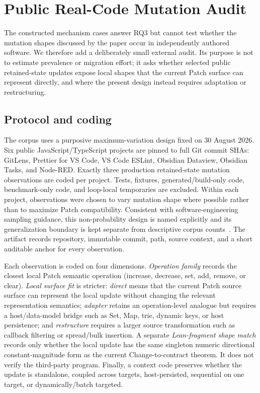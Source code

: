 \section{Public Real-Code Mutation Audit}
\label{sec:real-code-audit}

The constructed mechanism cases answer RQ3 but cannot test whether the mutation shapes discussed by the paper occur in independently authored software. We therefore add a deliberately small external audit. Its purpose is not to estimate prevalence or migration effort; it asks whether selected public retained-state updates expose local shapes that the current Patch surface can represent directly, and where the present design instead requires adaptation or restructuring.

\subsection{Protocol and coding}
The corpus uses a purposive maximum-variation design fixed on 30 August 2026. Six public JavaScript/TypeScript projects are pinned to full Git commit SHAs: GitLens, Prettier for VS Code, VS Code ESLint, Obsidian Dataview, Obsidian Tasks, and Node-RED. Exactly three production retained-state mutation observations are coded per project. Tests, fixtures, generated/build-only code, benchmark-only code, and loop-local temporaries are excluded. Within each project, observations were chosen to vary mutation shape where possible rather than to maximize Patch compatibility. Consistent with software-engineering sampling guidance, this non-probability design is named explicitly and its generalization boundary is kept separate from descriptive corpus counts~\cite{baltes2022sampling}. The artifact records repository, immutable commit, path, source context, and a short auditable anchor for every observation.

Each observation is coded on four dimensions. \emph{Operation family} records the closest local Patch semantic operation (increase, decrease, set, add, remove, or clear). \emph{Local surface fit} is stricter: \emph{direct} means that the current Patch source surface can represent the local update without changing the relevant representation semantics; \emph{adapter} retains an operation-level analogue but requires a host/data-model bridge such as Set, Map, trie, dynamic keys, or host persistence; and \emph{restructure} requires a larger source transformation such as callback filtering or spread/bulk insertion. A separate \emph{Lean-fragment shape match} records only whether the local update has the same singleton numeric directional constant-magnitude form as the current Change-to-contract theorem. It does not verify the third-party program. Finally, a context code preserves whether the update is standalone, coupled across targets, host-persisted, sequential on one target, or dynamically/batch targeted.

